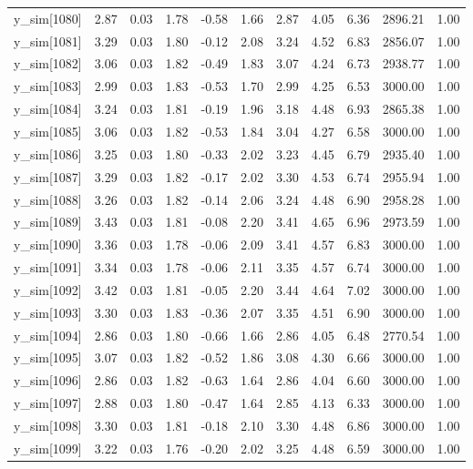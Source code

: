 \begin{table}[ht]
\begin{tabular}{rrrrrrrrrrr}
  y\_sim[1080] & 2.87 & 0.03 & 1.78 & -0.58 & 1.66 & 2.87 & 4.05 & 6.36 & 2896.21 & 1.00 \\ 
  y\_sim[1081] & 3.29 & 0.03 & 1.80 & -0.12 & 2.08 & 3.24 & 4.52 & 6.83 & 2856.07 & 1.00 \\ 
  y\_sim[1082] & 3.06 & 0.03 & 1.82 & -0.49 & 1.83 & 3.07 & 4.24 & 6.73 & 2938.77 & 1.00 \\ 
  y\_sim[1083] & 2.99 & 0.03 & 1.83 & -0.53 & 1.70 & 2.99 & 4.25 & 6.53 & 3000.00 & 1.00 \\ 
  y\_sim[1084] & 3.24 & 0.03 & 1.81 & -0.19 & 1.96 & 3.18 & 4.48 & 6.93 & 2865.38 & 1.00 \\ 
  y\_sim[1085] & 3.06 & 0.03 & 1.82 & -0.53 & 1.84 & 3.04 & 4.27 & 6.58 & 3000.00 & 1.00 \\ 
  y\_sim[1086] & 3.25 & 0.03 & 1.80 & -0.33 & 2.02 & 3.23 & 4.45 & 6.79 & 2935.40 & 1.00 \\ 
  y\_sim[1087] & 3.29 & 0.03 & 1.82 & -0.17 & 2.02 & 3.30 & 4.53 & 6.74 & 2955.94 & 1.00 \\ 
  y\_sim[1088] & 3.26 & 0.03 & 1.82 & -0.14 & 2.06 & 3.24 & 4.48 & 6.90 & 2958.28 & 1.00 \\ 
  y\_sim[1089] & 3.43 & 0.03 & 1.81 & -0.08 & 2.20 & 3.41 & 4.65 & 6.96 & 2973.59 & 1.00 \\ 
  y\_sim[1090] & 3.36 & 0.03 & 1.78 & -0.06 & 2.09 & 3.41 & 4.57 & 6.83 & 3000.00 & 1.00 \\ 
  y\_sim[1091] & 3.34 & 0.03 & 1.78 & -0.06 & 2.11 & 3.35 & 4.57 & 6.74 & 3000.00 & 1.00 \\ 
  y\_sim[1092] & 3.42 & 0.03 & 1.81 & -0.05 & 2.20 & 3.44 & 4.64 & 7.02 & 3000.00 & 1.00 \\ 
  y\_sim[1093] & 3.30 & 0.03 & 1.83 & -0.36 & 2.07 & 3.35 & 4.51 & 6.90 & 3000.00 & 1.00 \\ 
  y\_sim[1094] & 2.86 & 0.03 & 1.80 & -0.66 & 1.66 & 2.86 & 4.05 & 6.48 & 2770.54 & 1.00 \\ 
  y\_sim[1095] & 3.07 & 0.03 & 1.82 & -0.52 & 1.86 & 3.08 & 4.30 & 6.66 & 3000.00 & 1.00 \\ 
  y\_sim[1096] & 2.86 & 0.03 & 1.82 & -0.63 & 1.64 & 2.86 & 4.04 & 6.60 & 3000.00 & 1.00 \\ 
  y\_sim[1097] & 2.88 & 0.03 & 1.80 & -0.47 & 1.64 & 2.85 & 4.13 & 6.33 & 3000.00 & 1.00 \\ 
  y\_sim[1098] & 3.30 & 0.03 & 1.81 & -0.18 & 2.10 & 3.30 & 4.48 & 6.86 & 3000.00 & 1.00 \\ 
  y\_sim[1099] & 3.22 & 0.03 & 1.76 & -0.20 & 2.02 & 3.25 & 4.48 & 6.59 & 3000.00 & 1.00 \\ 

\end{tabular}
\end{table}
